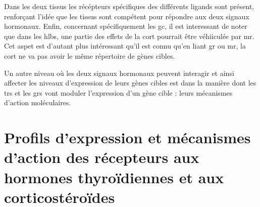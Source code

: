 \documentclass[../main.tex]{subfiles}
\begin{document}
Dans les deux tissus les récépteurs spécifiques des différents ligands sont présent, renforçant l'idée que les tissus sont compétent pour répondre aux deux signaux hormonaux.
Enfin, concernant spécifiquement les \gls{gc}, il est interessant de noter que dans les \glspl{hlb}, une partie des effets de la \gls{cort} pourrait être véhiiculée par \gls{mr}.
Cet aspet est d'autant plus intéressant qu'il est connu qu'en liant \gls{gr} ou \gls{mr}, la \gls{cort} ne va pas avoir le même répertoire de gènes cibles.
\par
Un autre niveau où les deux signaux hormonaux peuvent interagir et ainsi affecter les niveaux d'expression de leurs gènes cibles est dans la manière dont les \glspl{tr} et les \glspl{gr} vont moduler l'expression d'un gène cible :
leurs mécanismes d'action moléculaires.


\section{Profils d'expression et mécanismes d'action des récepteurs aux hormones thyroïdiennes et aux corticostéroïdes}
\end{document}

